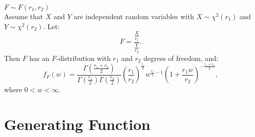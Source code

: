 \documentclass{huhtakm-template-book-v2}
\begin{document}
    \begin{seg} $F \sim F(r_{1},r_{2})$\\
        Assume that $X$ and $Y$ are independent random variables with $X \sim \chi^{2}(r_{1})$ and $Y \sim \chi^{2}(r_{2})$. Let:
        \begin{equation*}
            F = \frac{\frac{X}{r_{1}}}{\frac{Y}{r_{2}}}.
        \end{equation*}
        Then $F$ has an $F$-distribution with $r_{1}$ and $r_{2}$ degrees of freedom, and:
        \begin{equation*}
            f_{F}(w) = \frac{\Gamma\left(\frac{r_{1}+r_{2}}{2}\right)}{\Gamma\left(\frac{r_{1}}{2}\right)\Gamma\left(\frac{r_{2}}{2}\right)}\left(\frac{r_{1}}{r_{2}}\right)^{\frac{r_{1}}{2}}w^{\frac{r_{1}}{2}-1}\left(1+\frac{r_{1}w}{r_{2}}\right)^{-\frac{r_{1}+r_{2}}{2}},
        \end{equation*}
        where $0 < w < \infty$.
    \end{seg}

\chapter{Generating Function}
	\label{Chapter 7 (Generating Function)}
\end{document}
